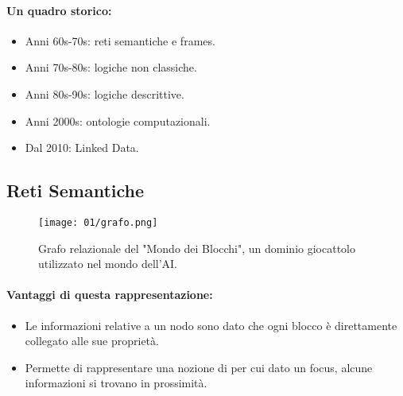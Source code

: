 \paragraph{Un quadro storico:}

\begin{itemize}
  \item Anni 60s-70s: reti semantiche e frames. 
  \item Anni 70s-80s: logiche non classiche. 
  \item Anni 80s-90s: logiche descrittive. 
  \item Anni 2000s: ontologie computazionali. 
  \item Dal 2010: Linked Data.
\end{itemize}

\subsection{Reti Semantiche}


\begin{figure}[h]
    \centering
    \texttt{[image: 01/grafo.png]}
    \caption{Grafo relazionale del "Mondo dei Blocchi", un dominio giocattolo utilizzato nel mondo dell'AI.}
\end{figure}


\paragraph{Vantaggi di questa rappresentazione:}

\begin{itemize}
  \item Le informazioni relative a un nodo sono  dato che ogni blocco è direttamente collegato alle sue proprietà. 
  \item Permette di rappresentare una nozione di  per cui dato un focus, alcune informazioni si trovano in prossimità. 
\end{itemize}

